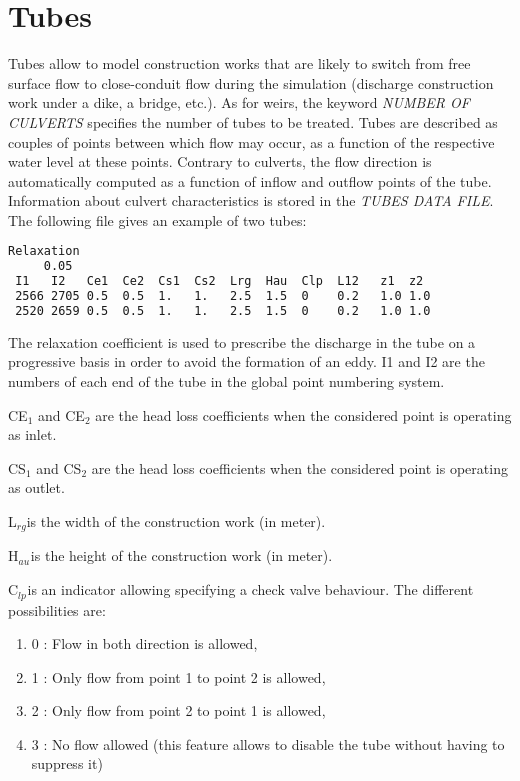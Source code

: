 \section{ Tubes}
\label{sec:tubes}
 Tubes allow to model construction works that are likely to switch from free surface flow to close-conduit flow during the simulation (discharge construction work under a dike, a bridge, etc.). As for weirs, the keyword \textit{NUMBER OF CULVERTS} specifies the number of tubes to be treated. Tubes are described as couples of points between which flow may occur, as a function of the respective water level at these points. Contrary to culverts, the flow direction is automatically computed as a function of inflow and outflow points of the tube.
 Information about culvert characteristics is stored in the \textit{TUBES DATA FILE}.
 The following file gives an example of two tubes:
\begin{lstlisting}[language=bash]
 Relaxation
     0.05
 I1   I2   Ce1  Ce2  Cs1  Cs2  Lrg  Hau  Clp  L12   z1  z2
 2566 2705 0.5  0.5  1.   1.   2.5  1.5  0    0.2   1.0 1.0
 2520 2659 0.5  0.5  1.   1.   2.5  1.5  0    0.2   1.0 1.0
\end{lstlisting}
 The relaxation coefficient is used to prescribe the discharge in the tube on a progressive basis in order to avoid the formation of an eddy. I1 and I2 are the numbers of each end of the tube in the global point numbering system.

 CE${}_{1}$ and CE${}_{2}$ are the head loss coefficients when the considered point is operating as inlet.

 CS${}_{1}$ and CS${}_{2}$ are the head loss coefficients when the considered point is operating as outlet.

 L${}_{rg }$is the width of the construction work (in meter).

 H${}_{au}$${}_{ }$is the height of the construction work (in meter).

 C${}_{lp}$${}_{ }$is an indicator allowing specifying a check valve behaviour. The different possibilities are:

\begin{enumerate}
\item  [\nonumber] 0 : Flow in both direction is allowed,

\item [\nonumber] 1 : Only flow from point 1 to point 2 is allowed,

\item [\nonumber] 2 : Only flow from point 2 to point 1 is allowed,

\item [\nonumber] 3 : No flow allowed (this feature allows to disable the tube without having to suppress it)
\end{enumerate}


